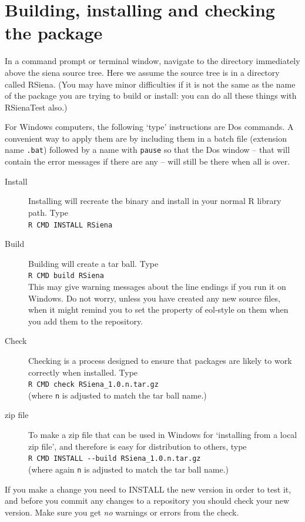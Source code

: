 \documentclass[a4paper,fleqn,11pt]{article}
\newcommand{\+}{\, + \,}
\newcommand{\sfn}[1]{\textsf{#1}}
\begin{document}
{\section{Building, installing and checking the package}
In a command prompt or terminal window, navigate to the directory
immediately above the
siena source tree. Here we assume the source tree is in a directory
called \sfn{RSiena}. (You may have minor
difficulties if it is not the same as the name of the package you are trying to
build or install: you can do all these things with \sfn{RSienaTest} also.)

For Windows computers, the following `type' instructions are Dos commands.
A convenient way to apply them are by including them in a batch
file (extension name \texttt{.bat}) followed by a name with \verb|pause|
so that the Dos window -- that will contain the error messages
if there are any -- will still be there when all is over.

\begin{description}
\item[Install] Installing will recreate the binary and install in your normal R
  library path. Type\\
\verb|R CMD INSTALL RSiena|
\item[Build] Building will create a tar ball. Type\\
\verb|R CMD build RSiena|\\
This may give warning messages about the line endings if you run it on
Windows. Do not worry, unless you have created any new source files, when it
might remind you to set the property of \textsf{eol-style} on them when you add
them to the repository.
\item [Check] Checking is a process designed to ensure that packages are likely
  to work correctly when installed. Type\\
\verb|R CMD check RSiena_1.0.n.tar.gz|\\
(where \verb|n| is adjusted to match the tar ball name.)
\item[zip file] To make a zip file that can be used in Windows for
`installing from a local zip file', and therefore is easy for distribution
to others, type\\
\verb|R CMD INSTALL --build RSiena_1.0.n.tar.gz| \\
(where again \verb|n| is adjusted to match the tar ball name.)
\end{description}

If you make a change you need to \textsf{INSTALL} the new version in order to
test it, and before you commit any changes to a repository you should
\textsf{check} your new version. Make sure you get \emph{no} warnings or
errors from the check.

}
\end{document}
